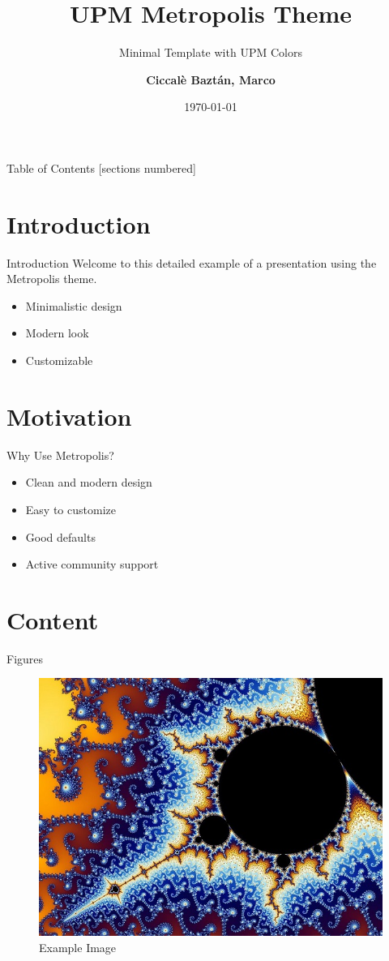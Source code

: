 \documentclass{beamer}
\title{UPM Metropolis Theme}
\subtitle{Minimal Template with UPM Colors}
\author{\textbf{Ciccalè Baztán, Marco}}
\date{\today}
\institute{Universidad Politécnica de Madrid (UPM)}
\begin{document}
\maketitle

\begin{frame}{Table of Contents}
  [sections numbered]
  \tableofcontents
\end{frame}

\section{Introduction}

\begin{frame}{Introduction}
  Welcome to this detailed example of a presentation using the Metropolis theme.
  \begin{itemize}
    \item Minimalistic design
    \item Modern look
    \item Customizable
  \end{itemize}
\end{frame}

\section{Motivation}

\begin{frame}{Why Use Metropolis?}
  \begin{itemize}
    \item Clean and modern design
    \item Easy to customize
    \item Good defaults
    \item Active community support
  \end{itemize}
\end{frame}

\section{Content}

\begin{frame}{Figures}
  \begin{figure}
    \centering
    \includegraphics[width=0.5\linewidth]{fractal.jpg}
    \caption{Example Image}
  \end{figure}

\end{frame}
\end{document}

